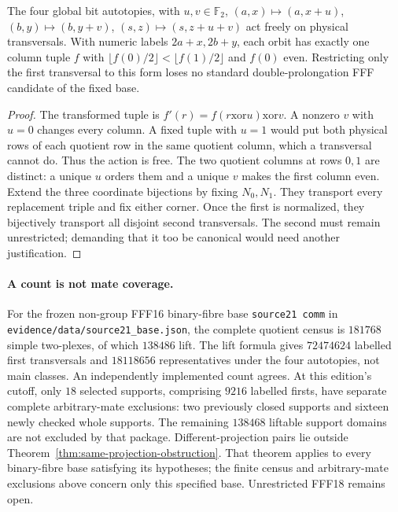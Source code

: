 \begin{proposition}
\label{prop:free-first-orbits}
The four global bit autotopies, with $u,v\in\mathbb F_2$,
$(a,x)\mapsto(a,x+u)$, $(b,y)\mapsto(b,y+v)$,
$(s,z)\mapsto(s,z+u+v)$ act freely on physical transversals.
With numeric labels $2a+x,2b+y$, each orbit has exactly one column
tuple $f$ with $\lfloor f(0)/2\rfloor<\lfloor f(1)/2\rfloor$ and
$f(0)$ even. Restricting only the first transversal to this form
loses no standard double-prolongation FFF candidate of the fixed base.
\end{proposition}
\begin{proof}
The transformed tuple is $f'(r)=f(r\mathbin{\mathrm{xor}}u)
\mathbin{\mathrm{xor}}v$. A nonzero $v$ with $u=0$ changes every
column. A fixed tuple with $u=1$ would put both physical rows of
each quotient row in the same quotient column, which a transversal
cannot do. Thus the action is free. The two quotient columns at
rows $0,1$ are distinct: a unique $u$ orders them and a unique $v$
makes the first column even.
Extend the three coordinate bijections by fixing $N_0,N_1$.
They transport every replacement triple and fix either corner.
Once the first is normalized, they bijectively transport all disjoint
second transversals. The second must remain unrestricted; demanding
that it too be canonical would need another justification.
\end{proof}

\paragraph{A count is not mate coverage.}
For the frozen non-group FFF16 binary-fibre base \texttt{source21 comm}
in \nolinkurl{evidence/data/source21_base.json}, the complete quotient
census is $181768$ simple two-plexes, of which $138486$ lift.
The lift formula gives $72474624$ labelled first transversals and
$18118656$ representatives under the four autotopies, not main classes.
An independently implemented count agrees. At this edition's cutoff,
only $18$ selected supports, comprising $9216$ labelled firsts, have
separate complete arbitrary-mate exclusions: two previously closed
supports and sixteen newly checked whole supports.
The remaining $138468$
liftable support domains are not excluded by that package.
Different-projection pairs lie outside
Theorem~\ref{thm:same-projection-obstruction}. That theorem applies to
every binary-fibre base satisfying its hypotheses; the finite census
and arbitrary-mate exclusions above concern only this specified base.
Unrestricted FFF18 remains open.
